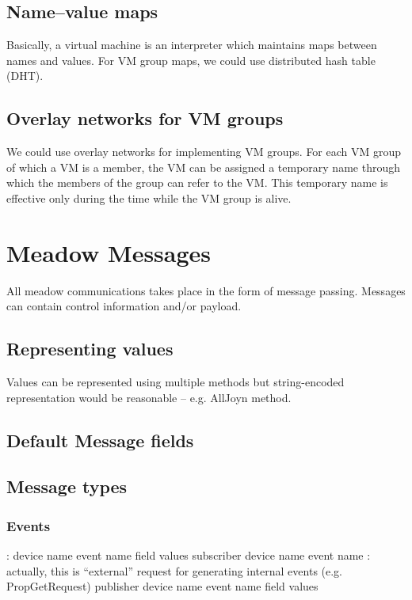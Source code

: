 \documentclass{note}
\begin{document}
\subsection{Name--value maps}
Basically, a virtual machine is an interpreter which maintains maps between
names and values. For VM group maps, we could use distributed hash table (DHT).

\subsection{Overlay networks for VM groups}
We could use overlay networks for implementing VM groups.
For each VM group of which a VM is a member, the VM can be assigned a
temporary name through which the members of the group can refer to the VM.
This temporary name is effective only during the time while the VM group is
alive.


\section{Meadow Messages}
All meadow communications takes place in the form of message passing.
Messages can contain control information and/or payload.

\subsection{Representing values}
Values can be represented using multiple methods but string-encoded
representation would be reasonable -- e.g. AllJoyn method.

\subsection{Default Message fields}
\bit
\w {}
\w {}
\w {}
\w {}
\eit


\subsection{Message types}

\subsubsection{Events}
\bit
{}:
   \bit
   \w device name
   \w event name
   \w field values
   \eit
{}
   \bit
   \w subscriber device name
   \w event name
   \eit
{}: actually, this is ``external'' request for
   generating internal events (e.g. PropGetRequest)
   \bit
   \w publisher device name
   \w event name
   \w field values
   \eit
\eit
\end{document}
